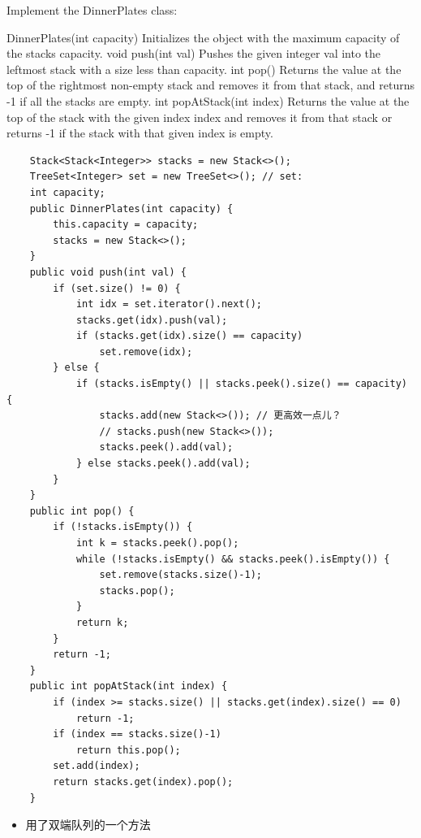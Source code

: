 \documentclass[9pt, b5paaper]{book}
\begin{document}
Implement the DinnerPlates class:

DinnerPlates(int capacity) Initializes the object with the maximum capacity of the stacks capacity.
void push(int val) Pushes the given integer val into the leftmost stack with a size less than capacity.
int pop() Returns the value at the top of the rightmost non-empty stack and removes it from that stack, and returns -1 if all the stacks are empty.
int popAtStack(int index) Returns the value at the top of the stack with the given index index and removes it from that stack or returns -1 if the stack with that given index is empty.
\begin{verbatim}
    Stack<Stack<Integer>> stacks = new Stack<>();
    TreeSet<Integer> set = new TreeSet<>(); // set: 
    int capacity;
    public DinnerPlates(int capacity) {
        this.capacity = capacity;
        stacks = new Stack<>();
    }
    public void push(int val) {
        if (set.size() != 0) {
            int idx = set.iterator().next();
            stacks.get(idx).push(val);
            if (stacks.get(idx).size() == capacity)
                set.remove(idx);
        } else {
            if (stacks.isEmpty() || stacks.peek().size() == capacity) {
                stacks.add(new Stack<>()); // 更高效一点儿？
                // stacks.push(new Stack<>());
                stacks.peek().add(val);
            } else stacks.peek().add(val);
        }
    }
    public int pop() {
        if (!stacks.isEmpty()) {
            int k = stacks.peek().pop();
            while (!stacks.isEmpty() && stacks.peek().isEmpty()) {
                set.remove(stacks.size()-1);
                stacks.pop();
            }
            return k;
        }
        return -1;
    }
    public int popAtStack(int index) {
        if (index >= stacks.size() || stacks.get(index).size() == 0) 
            return -1;
        if (index == stacks.size()-1)
            return this.pop();
        set.add(index);
        return stacks.get(index).pop();
    }
\end{verbatim}
\begin{itemize}
\item 用了双端队列的一个方法
\end{itemize}
\end{document}

